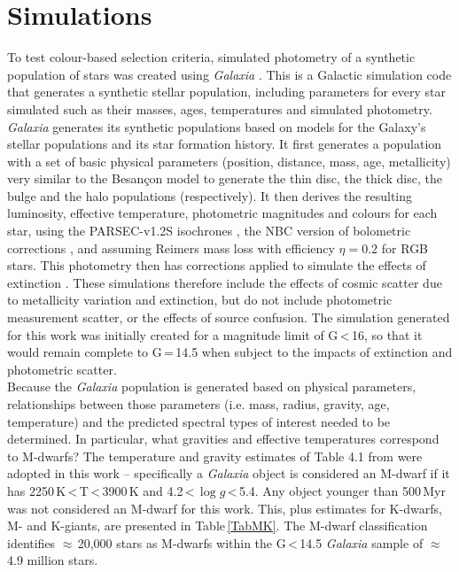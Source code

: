 \section{Simulations}
\label{secModel}
To test colour-based selection criteria,  simulated photometry of a synthetic population of stars was created using {\em Galaxia} \citep{2011Sharma}. This is a Galactic simulation code that generates a synthetic stellar population, including parameters for every star simulated such as their masses, ages, temperatures and simulated photometry. {\em Galaxia} generates its synthetic populations based on models for the Galaxy's stellar populations and its star formation history. It first generates a population with a set of basic physical parameters (position, distance, mass, age, metallicity) very similar to the Besan\c{c}on model \citep{2003Robin}  to generate the thin disc, the thick disc, the bulge and the halo populations (respectively). It then derives the resulting luminosity, effective temperature, photometric magnitudes and colours for each star, using the PARSEC-v1.2S isochrones \citep{2012Bressan, 2014Tang, 2014Chen, 2015Chen}, the NBC version of bolometric corrections \citep{2014Chen}, and assuming Reimers mass loss with efficiency $\eta=0.2$ for RGB stars. This photometry then has corrections applied to simulate the effects of extinction \citep{2011Sharma}. These simulations therefore include the effects of cosmic scatter due to metallicity variation and extinction, but do not include photometric measurement scatter, or the effects of source confusion. The simulation generated for this work was initially created for a magnitude limit of G\,\textless\,16, so that it would remain complete to G\,=\,14.5 when subject to the impacts of extinction and photometric scatter.\\

Because the {\em Galaxia} population is generated based on physical parameters,  relationships between those parameters (i.e. mass, radius, gravity, age, temperature) and the predicted spectral types of interest needed to be determined. In particular, what gravities and effective temperatures correspond to M-dwarfs? The temperature and gravity estimates of Table 4.1 from \citet{2005Reid} were adopted in this work -- specifically a {\em Galaxia} object is considered an M-dwarf if it has 2250\,K\,\textless\,T\,\textless\,3900\,K and 4.2\,\textless\,$\log g$\,\textless\,5.4. Any object younger than 500\,Myr was not considered an M-dwarf for this work. This, plus estimates for K-dwarfs, M- and K-giants, are presented in Table\,\ref{TabMK}. The M-dwarf classification identifies $\approx$\,20,000 stars as M-dwarfs within the G\,\textless\,14.5 {\em Galaxia} sample of $\approx$\,4.9 million stars.\\

